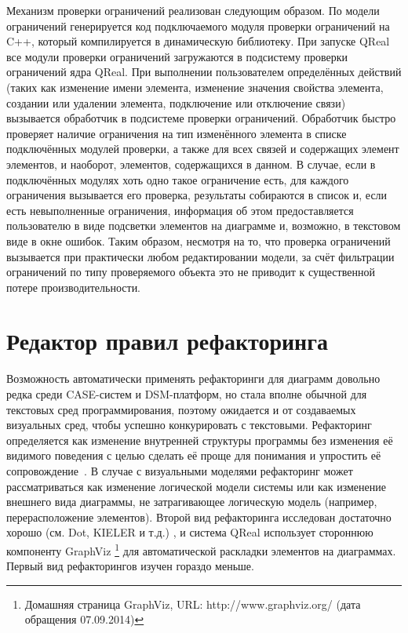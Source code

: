 Механизм проверки ограничений реализован следующим образом. По модели ограничений 
генерируется код подключаемого модуля проверки ограничений на C++, который компилируется 
в динамическую библиотеку. При запуске QReal все модули проверки ограничений загружаются 
в подсистему проверки ограничений ядра QReal. При выполнении пользователем определённых 
действий (таких как изменение имени элемента, изменение значения свойства элемента, 
создании или удалении элемента, подключение или отключение связи) вызывается обработчик 
в подсистеме проверки ограничений. Обработчик быстро проверяет наличие ограничения 
на тип изменённого элемента в списке подключённых модулей проверки, а также для всех 
связей и содержащих элемент элементов, и наоборот, элементов, содержащихся в данном. 
В случае, если в подключённых модулях хоть одно такое ограничение есть, для каждого 
ограничения вызывается его проверка, результаты собираются в список и, если есть невыполненные 
ограничения, информация об этом предоставляется пользователю в виде подсветки элементов 
на диаграмме и, возможно, в текстовом виде в окне ошибок. Таким образом, несмотря на то, 
что проверка ограничений вызывается при практически любом редактировании модели, за 
счёт фильтрации ограничений по типу проверяемого объекта это не приводит к существенной 
потере производительности.

\section{Редактор правил рефакторинга}
Возможность автоматически применять рефакторинги для диаграмм довольно редка среди CASE-систем и DSM-платформ, 
но стала вполне обычной для текстовых сред программирования, поэтому ожидается и от создаваемых визуальных сред, чтобы успешно конкурировать с текстовыми. 
Рефакторинг определяется как изменение внутренней структуры программы без изменения 
её видимого поведения с целью сделать её проще для понимания и упростить её сопровождение~\cite{fowler2003refactoring}. 
В случае с визуальными моделями рефакторинг может рассматриваться как изменение логической 
модели системы или как изменение внешнего вида диаграммы, не затрагивающее логическую 
модель (например, перерасположение элементов). Второй вид рефакторинга исследован 
достаточно хорошо (см. Dot, KIELER и т.д.)%
, и система QReal использует стороннюю компоненту GraphViz%
\footnote{Домашняя страница GraphViz, URL: http://www.graphviz.org/ (дата обращения 07.09.2014)}
для автоматической раскладки элементов на диаграммах. Первый вид рефакторингов изучен 
гораздо меньше.


